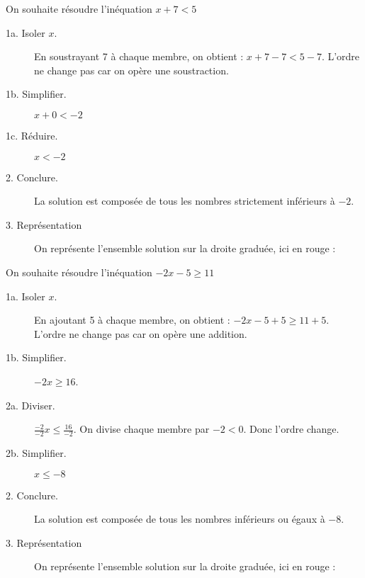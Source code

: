 \begin{Mt}   
On souhaite résoudre l'inéquation $x + 7 < 5$
\begin{description}
\item[1a. Isoler $x$.] En soustrayant 7 à chaque membre, on obtient : $x + 7 - 7 < 5 - 7$. L'ordre ne change pas car on opère une soustraction.
\item[1b. Simplifier.]  $x +0 < - 2$ 
\item[1c. Réduire.]  $x < - 2$  
\item[2. Conclure.] La solution est composée de tous les nombres strictement inférieurs  à $-2$.
\item[3. Représentation] On représente l'ensemble solution sur la droite graduée, ici en rouge :
 
\end{description}
\end{Mt} 

\begin{Mt}   
On souhaite résoudre l'inéquation $-2x - 5 \geq 11 $
\begin{description}
\item[1a. Isoler $x$.] En ajoutant 5 à chaque membre, on obtient :  $-2x - 5 +5 \geq 11 +5 $. L'ordre ne change pas car on opère une addition.
\item[1b. Simplifier.]  $-2x  \geq 16 $.
\item[2a. Diviser.]  $\frac{-2}{-2}x  \leq \frac{16}{-2}$. On divise chaque membre par $-2 <0$. Donc {\color{red}l'ordre change}.  
\item[2b. Simplifier.]  $x  \leq -8$  
\item[2. Conclure.] La solution est composée de tous les nombres inférieurs ou égaux à $-8$.
\item[3. Représentation]
On représente l'ensemble solution sur la droite graduée, ici en rouge : 

\end{description}
\end{Mt} 






